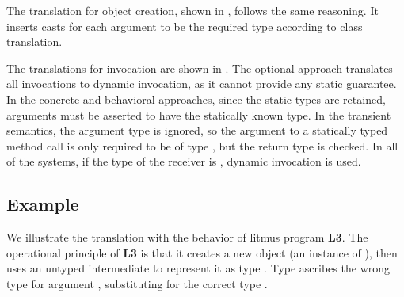 \documentclass[USenglish]{tex/lipics-v2016}
\begin{document}
The translation for object creation, shown in , follows
the same reasoning. It inserts casts for each argument to be the required type
according to class translation.

The translations for invocation are shown in .  The
optional approach translates all invocations to dynamic invocation, as it
cannot provide any static guarantee. In the concrete and behavioral
approaches, since the static types are retained, arguments must be asserted
to have the statically known type. In the transient semantics, the argument
type is ignored, so the argument to a statically typed method call is only
required to be of type \any, but the return type is checked.  In all of the
systems, if the type of the receiver is \any, dynamic invocation is used.

\newpage

\subsection{Example}

We illustrate the translation with the behavior of litmus program {\bf L3}.
The operational principle of {\bf L3} is that it creates a new object (an
instance of \C), then uses an untyped intermediate to represent it as type
\E. Type \E ascribes the wrong type for argument \x, substituting \D for the
correct type \C. 
\end{document}

